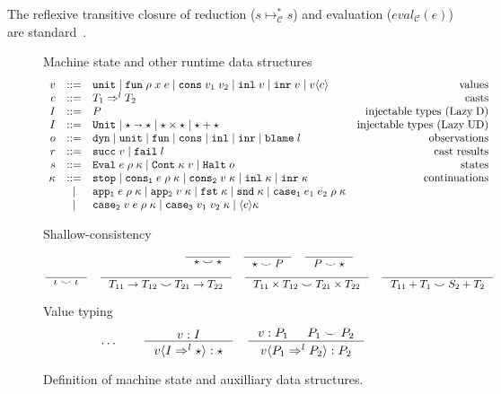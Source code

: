 \documentclass[acmsmall,review,anonymous]{acmart}\settopmatter{printfolios=true,printccs=false,printacmref=false}
\newcommand{\stxrule}[3]{#1 & ::= & #3 & \text{#2}\\}
\newcommand{\stxrulecont}[1]{& | & #1 & \\}
\newcommand{\plus}[0]{+}
\newcommand{\lazyUD}{Lazy\;UD}
\newcommand{\lazyD}{Lazy\;D}
\newcommand{\sOOinspect}[3]{\mathtt{Eval} \; #1 \; #2 \; #3}
\newcommand{\sOOreturn}[2]{\mathtt{Cont} \; #2 \; #1}
\newcommand{\sOOhalt}[1]{\mathtt{Halt} \; #1}
\newcommand{\TOOdyn}[0]{\star}
\newcommand{\POOunit}[0]{\mathtt{Unit}}
\newcommand{\POOfun}[2]{#1 \shortrightarrow #2}
\newcommand{\cOOcast}[3]{#1 \Rightarrow^{#2} #3}
\newcommand{\oOOinj}{\mathtt{dyn}}
\newcommand{\oOOsole}{\mathtt{unit}}
\newcommand{\oOOfun}{\mathtt{fun}}
\newcommand{\oOOcons}{\mathtt{cons}}
\newcommand{\oOOinl}{\mathtt{inl}}
\newcommand{\oOOinr}{\mathtt{inr}}
\newcommand{\oOOblame}[1]{\mathtt{blame} \; #1}
\newcommand{\vOOcast}[2]{#1\langle#2\rangle}
\newcommand{\vOOfun}[3]{\mathtt{fun} \; #1 \; #2 \; #3}
\newcommand{\vOOtt}[0]{\mathtt{unit}}
\newcommand{\vOOcons}[2]{\mathtt{cons}\;#1\;#2}
\newcommand{\vOOinl}[1]{\mathtt{inl}\;#1}
\newcommand{\vOOinr}[1]{\mathtt{inr}\;#1}
\newcommand{\rOOsucc}[1]{\mathtt{succ}\;#1}
\newcommand{\rOOfail}[1]{\mathtt{fail}\;#1}
\newcommand{\kOOmt}[0]{\mathtt{stop}}
\newcommand{\kOOconsI}[3]{\mathtt{cons_1} \; #1 \; #2 \; #3}
\newcommand{\kOOconsII}[2]{\mathtt{cons_2} \; #1 \; #2}
\newcommand{\kOOinl}[1]{\mathtt{inl} \; #1}
\newcommand{\kOOinr}[1]{\mathtt{inr} \; #1}
\newcommand{\kOOappI}[3]{
	\mathtt{app_1} \; #1 \; #2 \; #3
}
\newcommand{\kOOappII}[2]{
	\mathtt{app_2} \; #1 \; #2}
\newcommand{\kOOcar}[1]{
	\mathtt{fst} \; #1}
\newcommand{\kOOcdr}[1]{
	\mathtt{snd} \; #1}
\newcommand{\kOOcaseI}[4]{
	\mathtt{case_1} \; #1 \; #2 \; #3 \; #4}
\newcommand{\kOOcaseII}[4]{
	\mathtt{case_2} \; #1 \; #2 \; #3 \; #4}
\newcommand{\kOOcaseIII}[3]{
	\mathtt{case_3} \; #1 \; #2 \; #3}
\newcommand{\kOOcast}[2]{
	\langle #1 \rangle #2}
\newcommand{\judgeCreduceTrans}[2]{#1 \longmapsto_{\mathcal{C}}^{*} #2}
\begin{document}
The reflexive transitive closure of reduction ($
\judgeCreduceTrans{s}{s} $) and evaluation ($ eval_\mathcal{C}(e) $)
are standard~\citep{felleisen03:_pllc}.


\begin{figure}
  Machine state and other runtime data structures
  \[
  \begin{array}{rclr}
	\stxrule{v}{values}{
		\vOOtt{} \mid
		\vOOfun{\rho}{x}{e} \mid
		\vOOcons{v_1}{v_2} \mid
		\vOOinl{v} \mid
		\vOOinr{v} \mid		
		\vOOcast{v}{c}
	}
	\stxrule{c}{casts}{
		\cOOcast{T_1}{l}{T_2}
	}
	\stxrule{I}{injectable types (\lazyD)}{
		P
	}
	\stxrule{I}{injectable types (\lazyUD)}{
		\POOunit \mid
		\POOfun{\star}{\star} \mid
		\star \times \star \mid
		\star + \star
	}
	\stxrule{o}{observations}{
		\oOOinj \mid
		\oOOsole \mid
		\oOOfun \mid
		\oOOcons \mid
		\oOOinl \mid
		\oOOinr \mid
		\oOOblame{l}
	}
	\stxrule{r}{cast results}{
		\rOOsucc{v} \mid
		\rOOfail{l}
	}
	\stxrule{s}{states}{
		\sOOinspect{e}{\rho}{\kappa} \mid{}
		\sOOreturn{v}{\kappa} \mid{}
		\sOOhalt{o}
	}
	\stxrule{\kappa}{continuations}{
		\kOOmt \mid
		\kOOconsI{e}{\rho}{\kappa} \mid
		\kOOconsII{v}{\kappa} \mid
		\kOOinl{\kappa} \mid
		\kOOinr{\kappa}
	}
	\stxrulecont{
		\kOOappI{e}{\rho}{\kappa} \mid
		\kOOappII{v}{\kappa} \mid
		\kOOcar{\kappa} \mid
		\kOOcdr{\kappa} \mid
		\kOOcaseI{e_1}{e_2}{\rho}{\kappa}
	}
	\stxrulecont{	
		\kOOcaseII{v}{e}{\rho}{\kappa} \mid
		\kOOcaseIII{v_1}{v_2}{\kappa} \mid
		\kOOcast{c}{\kappa}
	}
  \end{array}
  \]

        Shallow-consistency
	\begin{gather*}
	\inference{}{
		\star \smile \star
	} \quad
	\inference{}{
		\star \smile P
	} \quad
	\inference{}{
		P \smile \star
	} \\
	\inference{}{
		\iota \smile \iota
	} \quad
	\inference{}{
		T_{11} \rightarrow T_{12} \smile T_{21} \rightarrow T_{22}
	} \quad
	\inference{}{
		T_{11} \times T_{12} \smile T_{21} \times T_{22}
	} \quad
	\inference{}{
	T_{11} \plus T_1 \smile S_2 \plus T_2
	}
	\end{gather*}
	
	Value typing 
	\begin{gather*}
	\dots \qquad
	\inference{
		v : I
	}{
		\vOOcast{v}{\cOOcast{I}{l}{\TOOdyn}} : \TOOdyn
	}
	\quad
	\inference{
		v : P_1 &
		P_1 \smile P_2
	}{
		\vOOcast{v}{\cOOcast{P_1}{l}{P_2}} : P_2
	}
	\end{gather*}
        \caption{Definition of machine state and auxilliary data
          structures.}
        \label{fig:state}
\end{figure}
\end{document}
